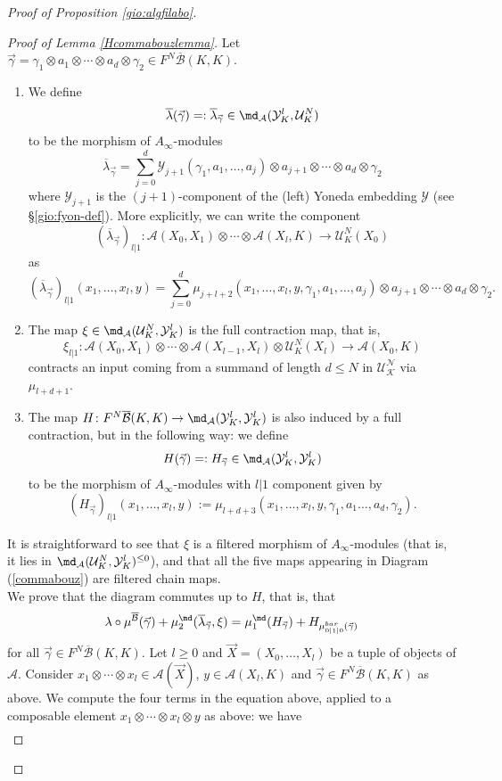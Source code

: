 \begin{proof}[Proof of Proposition \ref{gio:algfilabo}]
\begin{proof}[Proof of Lemma \ref{Hcommabouzlemma}]
			Let $\vec{\gamma}=\gamma_1\otimes a_1\otimes \cdots \otimes a_d\otimes \gamma_2\in F^N\overline{\mathcal{B}}(K,K)$.\begin{enumerate}
				\item[i.] We define $$\overline{\lambda}(\vec{\gamma}) =: \overline{\lambda}_{\vec{\gamma}}\in  \md_\mathcal{A}(\mathcal{Y}^l_K,\mathcal{U}^N_K)$$ to be the morphism of $A_\infty$-modules $$\overline{\lambda}_{\vec{\gamma}} = \sum_{j=0}^d\mathcal{Y}_{j+1}(\gamma_1,a_1,\ldots,a_j)\otimes a_{j+1}\otimes \cdots \otimes a_d\otimes \gamma_2$$ where $\mathcal{Y}_{j+1}$ is the $(j+1)$-component of the (left) Yoneda embedding $\mathcal{Y}$ (see \S\ref{gio:fyon-def}). More explicitly, we can write the component $$(\overline{\lambda}_{\vec{\gamma}})_{l|1}\colon \mathcal{A}(X_0,X_1)\otimes \cdots \otimes \mathcal{A}(X_l,K)\to \mathcal{U}^N_K(X_0)$$ as $$(\overline{\lambda}_{\vec{\gamma}})_{l|1}(x_1,\ldots, x_l,y) = \sum_{j=0}^d\mu_{j+l+2}(x_1,\ldots, x_l,y,\gamma_1,a_1,\ldots,a_j)\otimes a_{j+1}\otimes \cdots \otimes a_d\otimes \gamma_2.$$
				\item[ii.] The map $\xi\in \md_\mathcal{A}(\mathcal{U}^N_K,\mathcal{Y}^l_K)$ is the full contraction map, that is, $$\xi_{l|1}\colon \mathcal{A}(X_0,X_1)\otimes \cdots \otimes \mathcal{A}(X_{l-1},X_l)\otimes \mathcal{U}^N_K(X_l)\to \mathcal{A}(X_0,K)$$ contracts an input coming from a summand of length $d\leq N$ in $\mathcal{U^N_K}$ via $\mu_{l+d+1}$.
				\item[iii.] The map $H\colon F^N\overline{\mathcal{B}}(K,K)\to \md_\mathcal{A}(\mathcal{Y}^l_K,\mathcal{Y}^l_K)$ is also induced by a full contraction, but in the following way: we define  $$H(\vec{\gamma})=: H_{\vec{\gamma}}\in \md_\mathcal{A}(\mathcal{Y}^l_K,\mathcal{Y}^l_K)$$ to be the morphism of $A_\infty$-modules with $l|1$ component given by $$(H_{\vec{\gamma}})_{l|1}(x_1,\ldots, x_l,y) := \mu_{l+d+3}(x_1,\ldots, x_l,y,\gamma_1,a_1\ldots, a_d,\gamma_2).$$
			\end{enumerate}		
			It is straightforward to see that $\xi$ is a filtered morphism of $A_\infty$-modules (that is, it lies in $\md_\mathcal{A}(\mathcal{U}^N_K,\mathcal{Y}^l_K)^{\leq 0}$), and that all the five maps appearing in Diagram (\ref{commabouz}) are filtered chain maps.\\
			We prove that the diagram commutes up to $H$, that is, that $$\lambda\circ \mu^{\overline{\mathcal{B}}}(\vec{\gamma})+\mu_2^\md(\overline{\lambda}_{\vec{\gamma}},\xi) = \mu_1^\md(H_{\vec{\gamma}})+H_{\mu_{0|1|0}^{bar}(\vec{\gamma})}$$ for all $\vec{\gamma}\in F^N\overline{\mathcal{B}}(K,K)$. Let $l\geq 0$ and $\vec{X}=(X_0,\ldots, X_l)$ be a tuple of objects of $\mathcal{A}$. Consider $x_1\otimes \cdots\otimes x_l\in \mathcal{A}(\vec{X})$,  $y\in \mathcal{A}(X_l,K)$ and $\vec{\gamma}\in F^N\overline{\mathcal{B}}(K,K)$ as above. We compute the four terms in the equation above, applied to a composable element $x_1\otimes \cdots \otimes x_l\otimes y$ as above: we have $$\begin{aligned}

\end{aligned}$$
\end{proof}
\end{proof}
